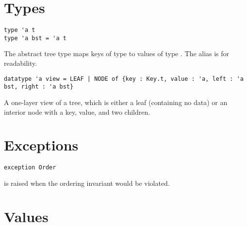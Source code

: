 \section{Types}
\label{sec:bst-interface::types}

\begin{cluster}
\label{grp:grm:bst-interface::type}

\begin{gram}
\label{grm:bst-interface::type}
\begin{verbatim}
type 'a t
type 'a bst = 'a t
\end{verbatim}
The abstract tree type  maps keys of type  to values of
type . The alias  is for readability.

\end{gram}
\end{cluster}

\begin{cluster}
\label{grp:grm:bst-interface::view}

\begin{gram}
\label{grm:bst-interface::view}
\begin{verbatim}
datatype 'a view = LEAF | NODE of {key : Key.t, value : 'a, left : 'a bst, right : 'a bst}
\end{verbatim}
A one-layer view of a tree, which is either a leaf (containing no data) or an
interior node with a key, value, and two children.

\end{gram}
\end{cluster}


\section{Exceptions}
\label{sec:bst-interface::exceptions}

\begin{cluster}
\label{grp:grm:bst-interface::exception}

\begin{gram}
\label{grm:bst-interface::exception}
\begin{verbatim}
exception Order
\end{verbatim}
 is raised when the ordering invariant would be violated.

\end{gram}
\end{cluster}


\section{Values}
\label{sec:bst-interface::values}

